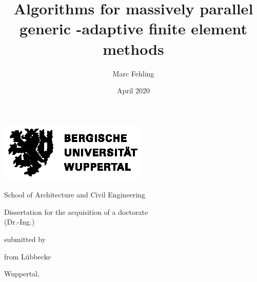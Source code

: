 \documentclass[10pt,a4paper,twoside,openright]{memoir}
\author{Marc Fehling}
\title{Algorithms for massively parallel generic \hp-adaptive finite element methods}
\date{April 2020}
\begin{document}
  \begin{titlingpage}
    \begin{center}
      \vspace*{\fill}
      \includegraphics[width=.75\textwidth]{logos/BUW_Logo-schwarz.eps}\bigskip
      \vspace*{\fill}\par
      {\Huge \thetitle\bigskip\par}
      \vspace*{\fill}\par
      {\Large School of Architecture and Civil Engineering\bigskip\par}
      {\Large Dissertation for the acquisition of a doctorate\\(Dr.-Ing.)\bigskip\par}
      {\Large submitted by\bigskip\par}
      {\LARGE \theauthor\par}
      {\Large from Lübbecke\bigskip\par}
      {\Large Wuppertal, \thedate\bigskip\bigskip\par}
    \end{center}
  \end{titlingpage}
  
  
  
  \frontmatter
  
  
  
  \clearpage

  \begin{otherlanguage}{ngerman}
    
  \end{otherlanguage}
  \clearpage
  
  \begin{KeepFromToc} %
    \tableofcontents
  \end{KeepFromToc}
  \cleardoublepage
  
  \listoffigures
  
\end{document}

